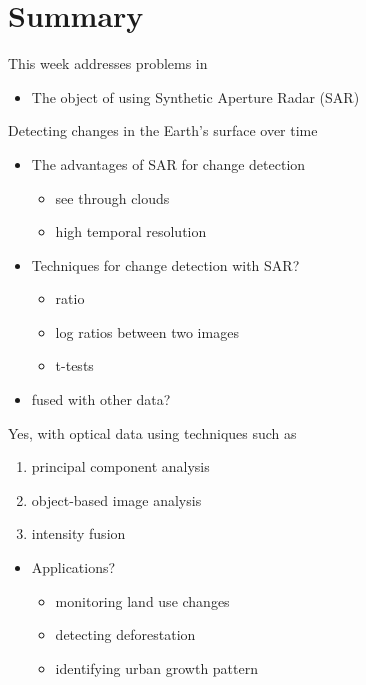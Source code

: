 \documentclass[
  letterpaper,
  DIV=11,
  numbers=noendperiod]{scrreprt}
\providecommand{\tightlist}{%
  \setlength{\itemsep}{0pt}\setlength{\parskip}{0pt}}\usepackage{longtable,booktabs,array}
\begin{document}
\hypertarget{summary-7}{%
\section{Summary}\label{summary-7}}

This week addresses problems in

\begin{itemize}
\tightlist
\item
  The object of using Synthetic Aperture Radar (SAR)
\end{itemize}

Detecting changes in the Earth's surface over time

\begin{itemize}
\tightlist
\item
  The advantages of SAR for change detection

  \begin{itemize}
  \tightlist
  \item
    see through clouds
  \item
    high temporal resolution
  \end{itemize}
\item
  Techniques for change detection with SAR?

  \begin{itemize}
  \tightlist
  \item
    ratio
  \item
    log ratios between two images
  \item
    t-tests
  \end{itemize}
\item
  fused with other data?
\end{itemize}

Yes, with optical data using techniques such as

\begin{enumerate}
\def\labelenumi{\arabic{enumi}.}
\tightlist
\item
  principal component analysis
\item
  object-based image analysis
\item
  intensity fusion
\end{enumerate}

\begin{itemize}
\tightlist
\item
  Applications?

  \begin{itemize}
  \tightlist
  \item
    monitoring land use changes
  \item
    detecting deforestation
  \item
    identifying urban growth pattern
  \end{itemize}
\end{itemize}
\end{document}
